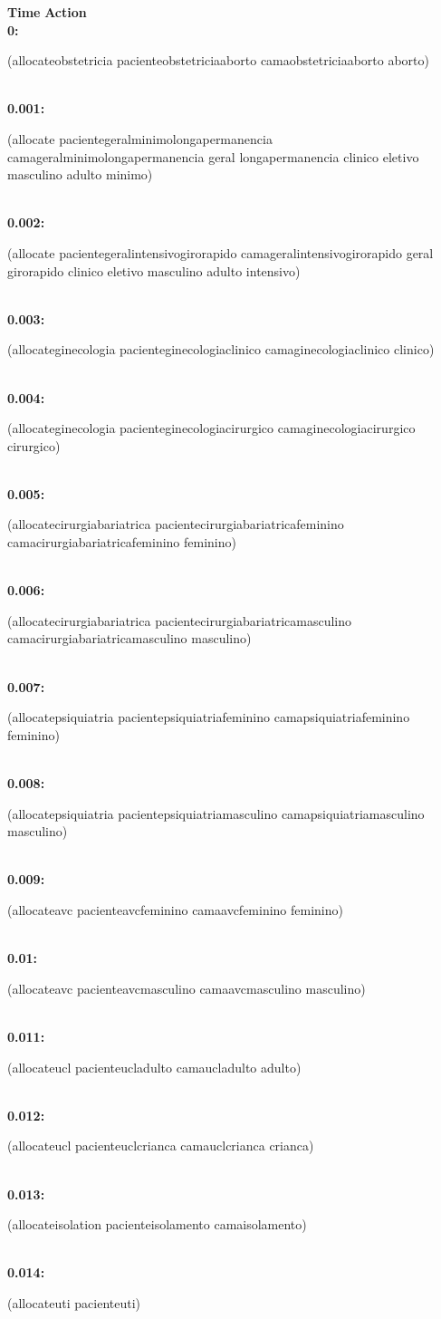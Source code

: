 \documentclass[a4paper,12pt]{article}
\newcommand{\headingtimeaction}{{\bf Time} \qquad \= {\bf Action}\\[0.8ex]}
\newcommand{\atime}[1]{{\bf #1:}}
\newcommand{\action}[1]{{\sf #1}}
\newcommand{\listrow}[1]{\begin{minipage}[t]{11.5cm} #1 \end{minipage}}
\begin{document}
\begin{tabbing}
\headingtimeaction 
\atime{0} \> \listrow{\action{(allocateobstetricia pacienteobstetriciaaborto camaobstetriciaaborto aborto)}}\\
\atime{0.001} \> \listrow{\action{(allocate pacientegeralminimolongapermanencia camageralminimolongapermanencia geral longapermanencia clinico eletivo masculino adulto minimo)}}\\
\atime{0.002} \> \listrow{\action{(allocate pacientegeralintensivogirorapido camageralintensivogirorapido geral girorapido clinico eletivo masculino adulto intensivo)}}\\
\atime{0.003} \> \listrow{\action{(allocateginecologia pacienteginecologiaclinico camaginecologiaclinico clinico)}}\\
\atime{0.004} \> \listrow{\action{(allocateginecologia pacienteginecologiacirurgico camaginecologiacirurgico cirurgico)}}\\
\atime{0.005} \> \listrow{\action{(allocatecirurgiabariatrica pacientecirurgiabariatricafeminino camacirurgiabariatricafeminino feminino)}}\\
\atime{0.006} \> \listrow{\action{(allocatecirurgiabariatrica pacientecirurgiabariatricamasculino camacirurgiabariatricamasculino masculino)}}\\
\atime{0.007} \> \listrow{\action{(allocatepsiquiatria pacientepsiquiatriafeminino camapsiquiatriafeminino feminino)}}\\
\atime{0.008} \> \listrow{\action{(allocatepsiquiatria pacientepsiquiatriamasculino camapsiquiatriamasculino masculino)}}\\
\atime{0.009} \> \listrow{\action{(allocateavc pacienteavcfeminino camaavcfeminino feminino)}}\\
\atime{0.01} \> \listrow{\action{(allocateavc pacienteavcmasculino camaavcmasculino masculino)}}\\
\atime{0.011} \> \listrow{\action{(allocateucl pacienteucladulto camaucladulto adulto)}}\\
\atime{0.012} \> \listrow{\action{(allocateucl pacienteuclcrianca camauclcrianca crianca)}}\\
\atime{0.013} \> \listrow{\action{(allocateisolation pacienteisolamento camaisolamento)}}\\
\atime{0.014} \> \listrow{\action{(allocateuti pacienteuti)}}\\
\end{tabbing}
\end{document}
